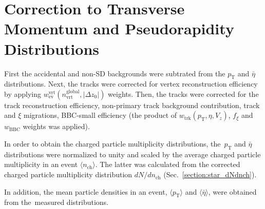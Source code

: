\section{Correction to Transverse Momentum and Pseudorapidity Distributions}\label{section:star_dNdeta_dNdpt}
First the accidental and non-SD backgrounds were subtrated from the $p_\textrm{T}$ and $\bar{\eta}$ distributions. Next, the tracks were  corrected for vertex reconstruction efficiency by applying $w_\textrm{ev}^\textrm{vrt}(n_\textrm{vrt}^\textrm{global},|\Delta z_0|)$ weights. Then, the tracks were corrected for the track reconstruction efficiency, non-primary track background contribution, track and $\xi$ migrations, BBC-small efficiency (the product of $w_\textrm{trk}(p_\textrm{T},\eta,V_z)$, $f_\xi$ and $w_\textrm{BBC}$ weights was applied). 

In order to obtain the charged particle multiplicity distributions, the~$p_\textrm{T}$ and $\bar{\eta}$ distributions   were normalized to unity and scaled by the average charged particle multiplicity in an event $\langle n_\textrm{ch}\rangle$. The latter was calculated from the corrected charged particle multiplicity distribution $dN/dn_\textrm{ch}$ (Sec.~\ref{section:star_dNdnch}).

 In addition, the mean particle densities in an event, $\langle p_\textrm{T}\rangle$ and $\langle \bar{\eta}\rangle$, were obtained from the~measured distributions.